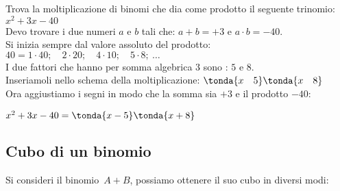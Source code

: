 \begin{esempio}{}{}
Trova la moltiplicazione di binomi che dia come prodotto il seguente 
trinomio: \(x^2+3x-40\)\\
Devo trovare i due numeri \(a\) e \(b\) tali che: 
\(a+b=+3\) e \(a \cdot b=-40\). \\
Si inizia sempre dal valore assoluto del prodotto:\quad
\(40 = 1 \cdot 40; \quad 2 \cdot 20; \quad 4 \cdot 10; 
  \quad 5 \cdot 8;~\dots\)\\
I due fattori che hanno per somma algebrica \(3\) sono : 
\(5\) e \(8\).\\
Inseriamoli nello schema della moltiplicazione: \quad
\(\tonda{x \quad 5} \tonda{x \quad 8}\)\\
Ora aggiustiamo i segni in modo che 
la somma sia \(+3\) e il prodotto \(-40\):\\[-1em]
\begin{center}\(x^2+3x-40 = \tonda{x-5} \tonda{x+8}\)\end{center}
\end{esempio}

\pagebreak %
\subsection{Cubo di un binomio}
\label{subsec:prodnot_cubo}

Si consideri il binomio~\(A+B\), possiamo ottenere il suo cubo 
in diversi modi:

